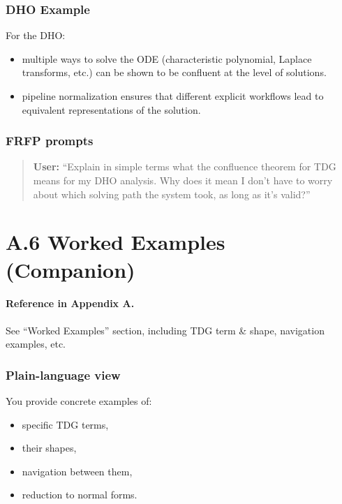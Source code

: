 \subsubsection*{DHO Example}

For the DHO:

\begin{itemize}
 \item multiple ways to solve the ODE (characteristic polynomial, Laplace transforms, etc.) can be
 shown to be confluent at the level of solutions.
 \item pipeline normalization ensures that different explicit workflows lead to equivalent
 representations of the solution.
\end{itemize}

\subsubsection*{FRFP prompts}

\begin{quote}
\textbf{User:} 
``Explain in simple terms what the confluence theorem for TDG means for my DHO analysis. 
Why does it mean I don't have to worry about which solving path the system took, as long as it's valid?'' 
\end{quote}

\newpage

\section{A.6 Worked Examples (Companion)}

\paragraph{Reference in Appendix A.}
See ``Worked Examples'' section, including TDG term \& shape, navigation examples, etc.

\subsubsection*{Plain-language view}

You provide concrete examples of:

\begin{itemize}
 \item specific TDG terms,
 \item their shapes,
 \item navigation between them,
 \item reduction to normal forms.
\end{itemize}

